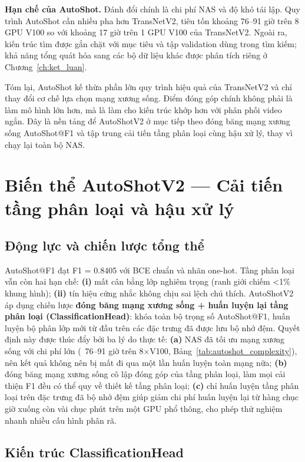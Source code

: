 \textbf{Hạn chế của AutoShot.} Đánh đổi chính là chi phí NAS và độ khó tái lập. Quy trình AutoShot cần nhiều pha hơn TransNetV2, tiêu tốn khoảng 76--91 giờ trên 8 GPU V100 so với khoảng 17 giờ trên 1 GPU V100 của TransNetV2. Ngoài ra, kiến trúc tìm được gắn chặt với mục tiêu và tập validation dùng trong tìm kiếm; khả năng tổng quát hóa sang các bộ dữ liệu khác được phân tích riêng ở Chương~\ref{ch:ket_luan}.

Tóm lại, AutoShot kế thừa phần lớn quy trình hiệu quả của TransNetV2 và chỉ thay đổi cơ chế lựa chọn mạng xương sống. Điểm đóng góp chính không phải là làm mô hình lớn hơn, mà là làm cho kiến trúc khớp hơn với phân phối video ngắn. Đây là nền tảng để AutoShotV2 ở mục tiếp theo đóng băng mạng xương sống AutoShot@F1 và tập trung cải tiến tầng phân loại cùng hậu xử lý, thay vì chạy lại toàn bộ NAS.

\section{Biến thể AutoShotV2 --- Cải tiến tầng phân loại và hậu xử lý}
\label{sec:autoshotv2}

\subsection{Động lực và chiến lược tổng thể}
\label{subsec:v2_motivation}

AutoShot@F1 đạt F1 = 0.8405 với BCE chuẩn và nhãn one-hot. Tầng phân loại vẫn còn hai hạn chế: \textbf{(i)} mất cân bằng lớp nghiêm trọng (ranh giới chiếm <1\% khung hình); \textbf{(ii)} tín hiệu cứng nhắc không chịu sai lệch chú thích. AutoShotV2 áp dụng chiến lược \textbf{đóng băng mạng xương sống + huấn luyện lại tầng phân loại (ClassificationHead)}: khóa toàn bộ trọng số AutoShot@F1, huấn luyện bộ phân lớp mới từ đầu trên các đặc trưng đã được lưu bộ nhớ đệm. Quyết định này được thúc đẩy bởi ba lý do thực tế: \textbf{(a)} NAS đã tối ưu mạng xương sống với chi phí lớn (~76--91 giờ trên 8$\times$V100, Bảng~\ref{tab:autoshot_complexity}), nên kết quả không nên bị mất đi qua một lần huấn luyện toàn mạng nữa; \textbf{(b)} đóng băng mạng xương sống cô lập đóng góp của tầng phân loại, làm mọi cải thiện F1 đều có thể quy về thiết kế tầng phân loại; \textbf{(c)} chỉ huấn luyện tầng phân loại trên đặc trưng đã bộ nhớ đệm giúp giảm chi phí huấn luyện lại từ hàng chục giờ xuống còn vài chục phút trên một GPU phổ thông, cho phép thử nghiệm nhanh nhiều cấu hình phân rã.

\subsection{Kiến trúc ClassificationHead}
\label{subsec:v2_head}

